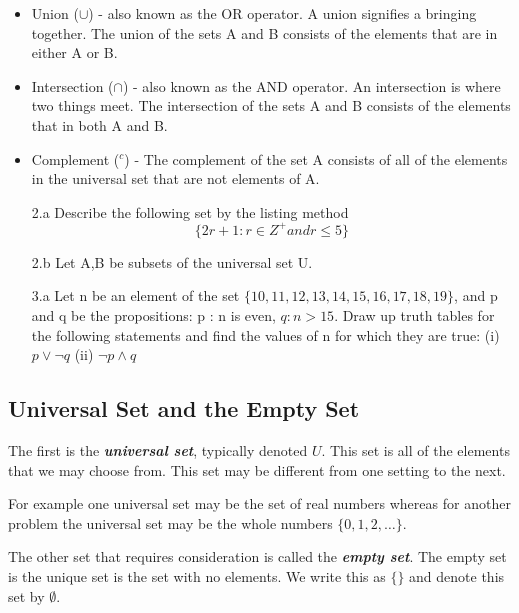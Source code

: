 \documentclass[]{report}
\begin{document}
\begin{itemize}
	\item Union ($\cup$) - also known as the OR operator. A union signifies a bringing together. The union of the sets A and B consists of the elements that are in either A or B.
	\item Intersection ($\cap$) - also known as the AND operator. An intersection is where two things meet. The intersection of the sets A and B consists of the elements that in both A and B.
	\item Complement ($^{c}$) - The complement of the set A consists of all of the elements in the universal set that are not elements of A.
\end{itemize}

\begin{itemize}
	\item[2.a] Describe the following set by the listing method
	\[ \{ 2r+1 : r \in Z^{+} and r \leq 5  \} \]
	\item[2.b] Let A,B be subsets of the universal set U.
	
	
\end{itemize}
\begin{itemize}
	\item[3.a]
	Let n be an element of the set $\{10, 11, 12, 13, 14, 15, 16, 17, 18, 19\}$,
	and p and q be the propositions:
	p : n is even, $q : n > 15$.
	Draw up truth tables for the following statements and find the values of n for
	which they are true:
	(i) $p \vee \neg q$
	(ii) $\neg p \wedge q$
\end{itemize}


\subsection{Universal Set and the Empty Set}
The first is the \textbf{\textit{universal set}}, typically denoted $U$. This set is all of the elements that we may choose from. This set may be different from one setting to the next. 

For example one universal set may be the set of real numbers whereas for another problem the universal set may be the whole numbers $\{0, 1, 2,\ldots\}$.

The other set that requires consideration is called the \textit{\textbf{empty set}}. The empty set is the unique set is the set with no elements. We write this as $\{ \}$ and denote this set by $\emptyset$.
\end{document}
